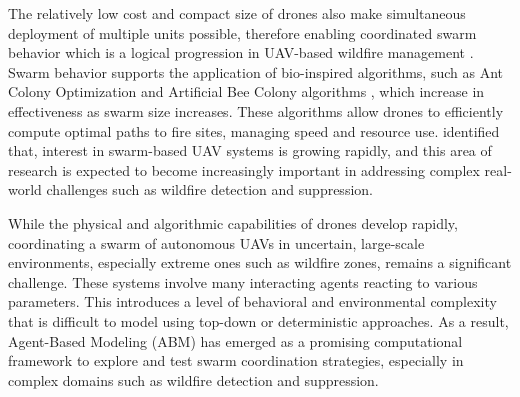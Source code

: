 \documentclass[11pt, a4paper]{article}
\begin{document}
The relatively low cost and compact size of drones also make simultaneous deployment of multiple units possible, therefore enabling coordinated swarm behavior which is a logical progression in UAV-based wildfire management \citep{MetaanalysisHumansystemInterfaces}. Swarm behavior supports the application of bio-inspired algorithms, such as Ant Colony Optimization \citep{HybridAntColonyWildfire} and Artificial Bee Colony algorithms \citep{karaboga2007abc}, which increase in effectiveness as swarm size increases. These algorithms allow drones to efficiently compute optimal paths to fire sites, managing speed and resource use. \citet*{MetaanalysisHumansystemInterfaces} identified that, interest in swarm-based UAV systems is growing rapidly, and this area of research is expected to become increasingly important in addressing complex real-world challenges such as wildfire detection and suppression.

While the physical and algorithmic capabilities of drones develop rapidly, coordinating a swarm of autonomous UAVs in uncertain, large-scale environments, especially extreme ones such as wildfire zones, remains a significant challenge. These systems involve many interacting agents reacting to various parameters. This introduces a level of behavioral and environmental complexity that is difficult to model using top-down or deterministic approaches. As a result, Agent-Based Modeling (ABM) has emerged as a promising computational framework to explore and test swarm coordination strategies, especially in complex domains such as wildfire detection and suppression.
\end{document}
